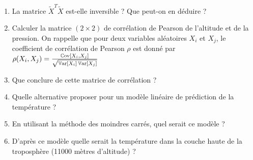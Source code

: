 \documentclass[solutions]{../exercices}
\begin{document}
\begin{exercice}
\begin{enumerate}
	\item La matrice $\tilde{X}^T \tilde{X}$ est-elle inversible ? Que peut-on en déduire ?
	\item Calculer la matrice $(2 \times 2)$ de corrélation de Pearson de l'altitude et de la pression. On rappelle que pour deux variables aléatoires $X_i$ et $X_j$, le coefficient de corrélation de Pearson $\rho$ est donné par $\rho(X_i, X_j) = \frac{\mathbb{C}\mathrm{ov}[X_i, X_j]}{\sqrt{\mathbb{V}\mathrm{ar}[X_i] \, \mathbb{V}\mathrm{ar}[X_j]}}$
	\item Que conclure de cette matrice de corrélation ?
	\item Quelle alternative proposer pour un modèle linéaire de prédiction de la température ?
	\item En utilisant la méthode des moindres carrés, quel serait ce modèle ?
	\item D'après ce modèle quelle serait la température dans la couche haute de la troposphère (11000 mètres d'altitude) ?

\end{enumerate}
\end{exercice}
\end{document}
